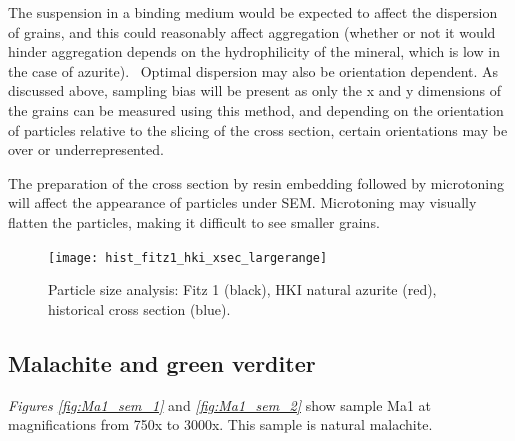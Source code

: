 The suspension in a binding medium would be expected to affect the dispersion of grains, and this could reasonably affect aggregation (whether or not it would hinder aggregation depends on the hydrophilicity of the mineral, which is low in the case of azurite).~\autocite{Zhang} Optimal dispersion may also be orientation dependent. As discussed above, sampling bias will be present as only the x and y dimensions of the grains can be measured using this method, and depending on the orientation of particles relative to the slicing of the cross section, certain orientations may be over or underrepresented. 

The preparation of the cross section by resin embedding followed by microtoning will affect the appearance of particles under SEM. Microtoning may visually flatten the particles, making it difficult to see smaller grains. 

\begin{figure}[H]
\centering
  \texttt{[image: hist\_fitz1\_hki\_xsec\_largerange]}
\caption[Particle size analysis: HKI natural azurite, Fitz 1, historical cross section]{Particle size analysis: Fitz 1 (black), HKI natural azurite (red), historical cross section (blue).} 
\label{fig:hist_all}
\end{figure}




\subsection[Malachite and green verditer]{Malachite and green verditer}
\label{subsection3.1.2}


\textit{Figures \ref{fig:Ma1_sem_1}} and \textit{\ref{fig:Ma1_sem_2}} show sample Ma1 at magnifications from 750x to 3000x. This sample is natural malachite.

